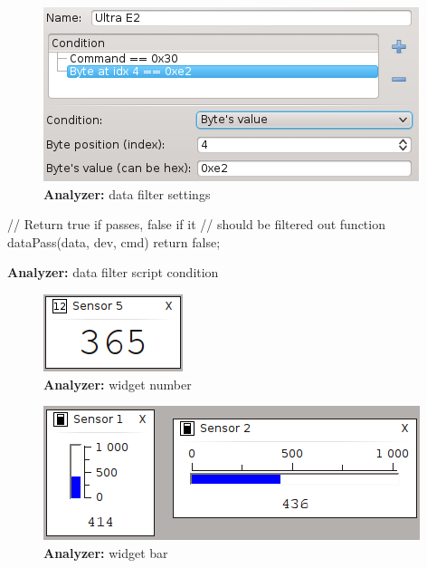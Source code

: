 \documentclass[12pt, a4paper, oneside]{article}
\newcommand{\B}{\textbf} %
\begin{document}
\begin{figure}[H]
\begin{center}
\includegraphics[scale=0.9]{../img/filters.png}
\caption{\B{Analyzer:} data filter settings}
\end{center}
\end{figure}

\begin{listing}[H]
\begin{jscode}
// Return true if passes, false if it
// should be filtered out
function dataPass(data, dev, cmd) {
    return false;
}
\end{jscode}
\caption{\B{Analyzer:} data filter script condition}
\end{listing}

\begin{figure}[h]
\begin{center}
\includegraphics[scale=1]{../img/w_num.png}
\caption{\B{Analyzer:} widget number}
\end{center}
\end{figure}

\begin{figure}[H]
\begin{center}
\includegraphics{../img/w_bar.png}
\caption{\B{Analyzer:} widget bar}
\end{center}
\end{figure}
\end{document}
